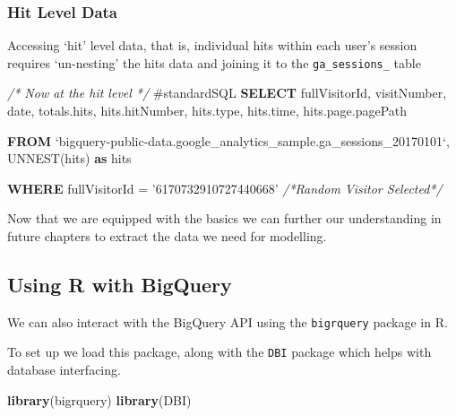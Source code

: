 \documentclass[]{book}
\newenvironment{Shaded}{\begin{snugshade}}{\end{snugshade}}
\newcommand{\CommentTok}[1]{\textcolor[rgb]{0.56,0.35,0.01}{\textit{#1}}}
\newcommand{\DataTypeTok}[1]{\textcolor[rgb]{0.13,0.29,0.53}{#1}}
\newcommand{\KeywordTok}[1]{\textcolor[rgb]{0.13,0.29,0.53}{\textbf{#1}}}
\newcommand{\NormalTok}[1]{#1}
\newcommand{\StringTok}[1]{\textcolor[rgb]{0.31,0.60,0.02}{#1}}
\begin{document}
\hypertarget{hit-level-data}{%
\subsubsection{Hit Level Data}\label{hit-level-data}}

Accessing `hit' level data, that is, individual hits within each user's session
requires `un-nesting' the hits data and joining it to the \texttt{ga\_sessions\_} table

\begin{Shaded}
\begin{Highlighting}[]
\CommentTok{/* Now at the hit level */}
\NormalTok{#standardSQL}
\KeywordTok{SELECT}\NormalTok{  fullVisitorId,  }
\NormalTok{        visitNumber, }
        \DataTypeTok{date}\NormalTok{, }
\NormalTok{        totals.hits, }
\NormalTok{        hits.hitNumber, }
\NormalTok{        hits.type, }
\NormalTok{        hits.time, }
\NormalTok{        hits.page.pagePath}
        
\KeywordTok{FROM}\NormalTok{ `bigquery-public-data.google_analytics_sample.ga_sessions_20170101`,}
\NormalTok{  UNNEST(hits) }\KeywordTok{as}\NormalTok{ hits}
  
\KeywordTok{WHERE}\NormalTok{ fullVisitorId = }\StringTok{'6170732910727440668'} \CommentTok{/*Random Visitor Selected*/}
\end{Highlighting}
\end{Shaded}

Now that we are equipped with the basics we can further our understanding
in future chapters to extract the data we need for modelling.

\hypertarget{using-r-with-bigquery}{%
\subsection{Using R with BigQuery}\label{using-r-with-bigquery}}

We can also interact with the BigQuery API using the \texttt{bigrquery} package in R.

To set up we load this package, along with the \texttt{DBI} package which helps with
database interfacing.

\begin{Shaded}
\begin{Highlighting}[]
\KeywordTok{library}\NormalTok{(bigrquery)}
\KeywordTok{library}\NormalTok{(DBI)}
\end{Highlighting}
\end{Shaded}
\end{document}
